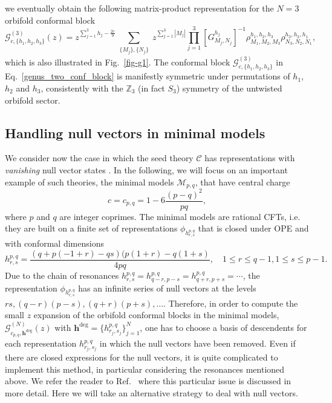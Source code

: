 \documentclass[a4paper,11pt]{article}
\begin{document}
we eventually obtain the following matrix-product representation for the $N=3$ orbifold conformal block \cite{Collier}
\begin{equation}\label{genus_two_conf_block}
 \mathcal{G}_{c, \{h_1, h_2, h_3\}}^{(3)}(z)=
z^{\sum_{j=1}^3 h_j-\frac{2c}{9}}\sum_{\substack{\{M_j\}, \{N_j\}}}
 z^{\sum\limits_{j=1}^3 |M_j|}
 \prod_{j=1}^3 [G_{M_j,N_j}^{h_j}]^{-1}
 \rho^{h_1,h_2,h_3}_{M_1,M_2,M_3}\rho_{N_3,N_2,N_1}^{h_3,h_2,h_1},
\end{equation}
which is also illustrated in Fig.~\ref{fig-g1}.
The conformal block $\mathcal{G}_{c, \{h_1, h_2, h_3\}}^{(3)}$ in Eq.~\eqref{genus_two_conf_block} is
manifestly symmetric under permutations of $h_1$, $h_2$ and $h_3$, consistently with the $\mathbb Z_3$ (in fact $S_3$) symmetry of the untwisted orbifold sector.

\subsection{Handling null vectors in minimal models}
\label{null_vec1}
We consider now the case in which the seed theory $\mathcal{C}$ has representations with {\it vanishing} null vector states \cite{BPZ}. 
In the following, we will focus on an important example of such theories, the minimal models $\mathcal{M}_{p,q}$, that have central charge
\begin{equation}
c=c_{p,q}= 1 -6\frac{ (p-q)^2}{p q},
\end{equation}
where $p$ and $q$ are integer coprimes. The minimal models are rational CFTs, i.e. they are built on a finite set of representations $\phi_{h^{p,q}_{r,s}}$ that is closed under OPE and with conformal dimensions
 \begin{equation}
 h^{p,q}_{r,s}=\frac{(q + p (-1 + r) - q s) (p (1 + r) - q (1 + s)}{4 p q}, \quad 1\leq r\leq q-1,  1\leq s\leq p-1.
 \end{equation}
Due to the chain of resonances $h_{r,s}^{p, q}=h_{q-r,p-s}^{p, q}=h_{q+r,p+s}^{p, q}=\cdots$, the representation $\phi_{h^{p,q}_{r,s}}$ has an infinite series of null vectors at the levels $r s, (q-r)(p-s),(q+r)(p+s), \dots$. Therefore, in order to compute the small $z$ expansion of the orbifold conformal blocks in the minimal models, $\mathcal{G}_{c_{p,q}, \boldsymbol{h}^{\text{deg}}}^{(N)}(z)$ with $\boldsymbol{h}^{\text{deg}}=\{h_{r_j, s_j}^{p, q}\}_{j=1}^N$, one has to choose a basis of descendents for each representation $h_{r_j, s_j}^{p, q}$ in which the null vectors have been removed. Even if there are closed expressions for the null vectors, it is quite complicated to implement this method, in particular considering the resonances mentioned above. We refer the reader to Ref.~\cite{Javerzat} where this particular issue is discussed in more detail. Here we will take an alternative strategy to deal with null vectors.
 
\end{document}

